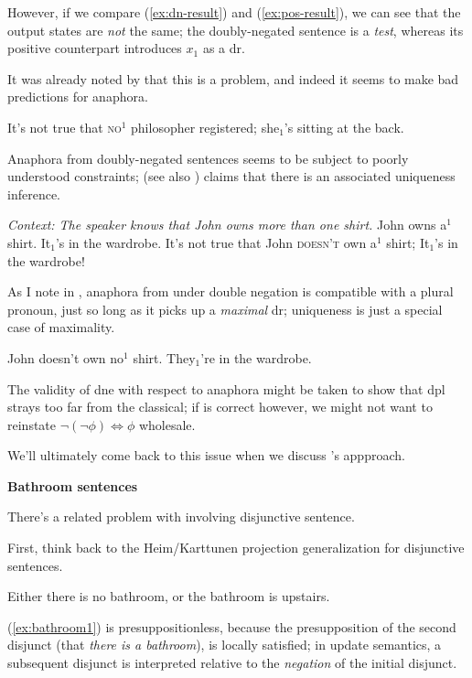 \documentclass[nols,twoside,nofonts,nobib,nohyper]{tufte-handout}
\theoremstyle{observation}
\theoremstyle{theorem}
\theoremstyle{corollary}
\theoremstyle{definition}
\begin{document}
However, if we compare (\ref{ex:dn-result}) and (\ref{ex:pos-result}), we can see that the output states are \textit{not} the same; the doubly-negated sentence is a \textit{test}, whereas its positive counterpart introduces $x_{1}$ as a \ac{dr}.

It was already noted by \citeauthor{GroenendijkStokhof1991} that this is a problem, and indeed it seems to make bad predictions for anaphora.

\ex
It's not true that \textsc{no}$^{1}$ philosopher registered; she$_{1}$'s sitting at the back.
\xe

Anaphora from doubly-negated sentences seems to be subject to poorly understood constraints; \citet{Gotham2019} (see also \citealt{KrahmerMuskens1995}) claims that there is an associated uniqueness inference.

\pex \textit{Context: The speaker knows that John owns more than one shirt.}
\a John owns a$^{1}$ shirt. It$_{1}$'s in the wardrobe.
\a{}It's not true that John \textsc{doesn't} own a$^{1}$ shirt; It$_{1}$'s in the wardrobe!
\xe

As I note in \cite{Elliott2020b}, anaphora from under double negation is compatible with a plural pronoun, just so long as it picks up a \textit{maximal} \ac{dr}; uniqueness is just a special case of maximality.

\ex
John doesn't own no$^{1}$ shirt. They$_{1}$'re in the wardrobe.
\xe

The validity of \ac{dne} with respect to anaphora might be taken to show that \ac{dpl} strays too far from the classical; if \citeauthor{Gotham2019} is correct however, we might not want to reinstate $¬ (¬ ϕ) ⇔ ϕ$ wholesale.

We'll ultimately come back to this issue when we discuss \citeauthor{Mandelkern2020a}'s appproach.

\textbf{Bathroom sentences}

There's a related problem with involving disjunctive sentence.

First, think back to the Heim/Karttunen projection generalization for disjunctive sentences.

\ex
Either there is no bathroom, or the bathroom is upstairs.\label{ex:bathroom1}
\xe

(\ref{ex:bathroom1}) is presuppositionless, because the presupposition of the second disjunct (that \textit{there is a bathroom}), is locally satisfied; in update semantics, a subsequent disjunct is interpreted relative to the \textit{negation} of the initial disjunct.
\end{document}

